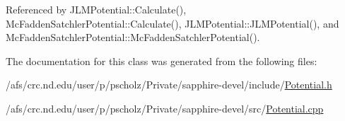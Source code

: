 Referenced by J\-L\-M\-Potential\-::\-Calculate(), Mc\-Fadden\-Satchler\-Potential\-::\-Calculate(), J\-L\-M\-Potential\-::\-J\-L\-M\-Potential(), and Mc\-Fadden\-Satchler\-Potential\-::\-Mc\-Fadden\-Satchler\-Potential().



The documentation for this class was generated from the following files\-:\begin{DoxyCompactItemize}
\item 
/afs/crc.\-nd.\-edu/user/p/pscholz/\-Private/sapphire-\/devel/include/\hyperlink{Potential_8h}{Potential.\-h}\item 
/afs/crc.\-nd.\-edu/user/p/pscholz/\-Private/sapphire-\/devel/src/\hyperlink{Potential_8cpp}{Potential.\-cpp}\end{DoxyCompactItemize}
